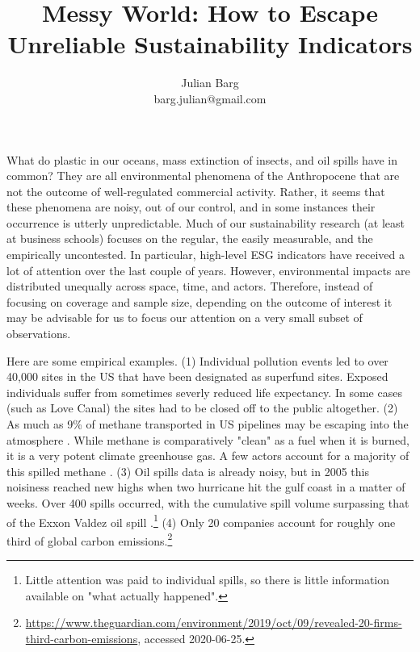 \documentclass[12pt, man, natbib]{apa6}
\title{Messy World: How to Escape Unreliable Sustainability Indicators}
\author{Julian Barg\\barg.julian@gmail.com}
\affiliation{Ivey Business School}
\begin{document}
	
	\maketitle
	
	\singlespacing
	
	\section{}
	
	What do plastic in our oceans, mass extinction of insects, and oil spills have in common? They are all environmental phenomena of the Anthropocene that are not the outcome of well-regulated commercial activity. Rather, it seems that these phenomena are noisy, out of our control, and in some instances their occurrence is utterly unpredictable. Much of our sustainability research (at least at business schools) focuses on the regular, the easily measurable, and the empirically uncontested. In particular, high-level ESG indicators have received a lot of attention over the last couple of years. However, environmental impacts are distributed unequally across space, time, and actors. Therefore, instead of focusing on coverage and sample size, depending on the outcome of interest it may be advisable for us to focus our attention on a very small subset of observations.
	
	Here are some empirical examples. (1) Individual pollution events led to over 40,000 sites in the US that have been designated as superfund sites. Exposed individuals suffer from sometimes severly reduced life expectancy. In some cases (such as Love Canal) the sites had to be closed off to the public altogether. (2) As much as 9\% of methane transported in US pipelines may be escaping into the atmosphere \citep{Tollefson2013}. While methane is comparatively "clean" as a fuel when it is burned, it is a very potent climate greenhouse gas. A few actors account for a majority of this spilled methane \citep{Tollefson2013}. (3) Oil spills data is already noisy, but in 2005 this noisiness reached new highs when two hurricane hit the gulf coast in a matter of weeks. Over 400 spills occurred, with the cumulative spill volume surpassing that of the Exxon Valdez oil spill \citep{Cruz2009}.\footnote{Little attention was paid to individual spills, so there is little information available on "what actually happened".} (4) Only 20 companies account for roughly one third of global carbon emissions.\footnote{\url{https://www.theguardian.com/environment/2019/oct/09/revealed-20-firms-third-carbon-emissions}, accessed 2020-06-25.}
	
\end{document}
